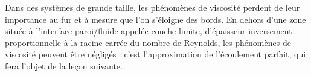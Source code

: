 \documentclass[11pt,a4paper]{report}
\begin{document}
Dans des systèmes de grande taille, les phénomènes de viscosité perdent de leur importance au fur et à mesure que l'on s'éloigne des bords. En dehors d'une zone située à l'interface paroi/fluide appelée couche limite, d'épaisseur inversement proportionnelle à la racine carrée du nombre de Reynolds, les phénomènes de viscosité peuvent être négligés : c'est l'approximation de l'écoulement parfait, qui fera l'objet de la leçon suivante.
\end{document}
